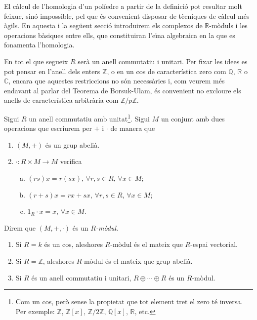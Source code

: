 \documentclass[../main.tex]{subfiles}
\begin{document}
El càlcul de l'homologia d'un políedre a partir de la definició pot resultar molt feixuc, sinó impossible, pel que és convenient disposar de tècniques de càlcul més àgils. En aquesta i la següent secció introduirem els complexos de $\mathbb{R}$-mòduls i les operacions bàsiques entre ells, que constituiran l'eïna algebraica en la que es fonamenta l'homologia.

En tot el que segueix $R$ serà un anell commutatiu i unitari. Per fixar les idees es pot pensar en l'anell dels enters $\mathbb{Z}$, o en un cos de característica zero com $\mathbb{Q}$, $\mathbb{R}$ o $\mathbb{C}$, encara que aquestes restriccions no són necessàries i, com veurem més endavant al parlar del Teorema de Borsuk-Ulam, és convenient no excloure els anells de característica arbitrària com $\mathbb{Z}/p\mathbb{Z}$.



\begin{defi}[$R$-mòdul]
Sigui $R$ un anell commutatiu amb unitat\footnote{Com un cos, però sense la propietat que tot element tret el zero té inversa. Per exemple: $\mathbb{Z}$, $\mathbb{Z}[x]$, $\mathbb{Z}/2\mathbb{Z}$, $\mathbb{Q}[x]$, $\mathbb{R}$, etc.}. Sigui $M$ un conjunt amb dues operacions que escriurem per $+$ i $\cdotp$ de manera que
\begin{enumerate}[(1)]
    \item $(M,+)$ és un grup abelià.
    \item $\cdotp:R\times M\rightarrow M$ verifica
    \begin{enumerate}[(a)]
        \item $(rs)x = r(sx)$, $\forall r,s\in R$, $\forall x\in M$;
        \item $(r+s)x= rx+sx$, $\forall r,s\in R$, $\forall x\in M$;
        \item $1_R\cdotp x = x$, $\forall x\in M$.
    \end{enumerate}
\end{enumerate}
Direm que $(M,+,\cdotp)$ és un \textit{$R$-mòdul}.
\end{defi}


\begin{ej}
\begin{enumerate}[(1)]
    \item Si $R = k$ és un cos, aleshores $R$-mòdul és el mateix que $R$-espai vectorial.
    \item Si $R = \mathbb{Z}$, aleshores $R$-mòdul és el mateix que grup abelià.
    \item Si $R$ és un anell commutatiu i unitari, $R\oplus\cdots\oplus R$ és un $R$-mòdul.
\end{enumerate}
\end{ej}
\end{document}

